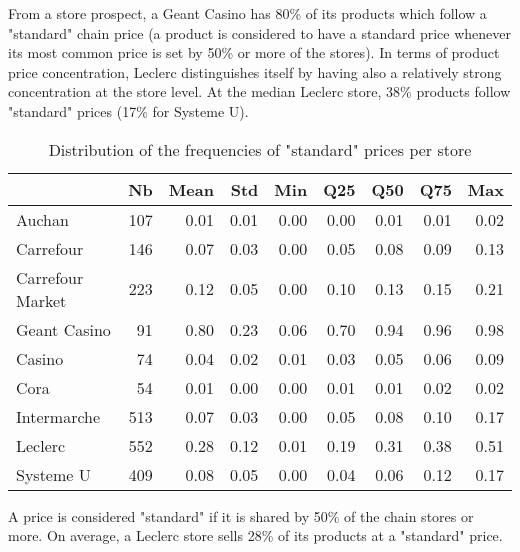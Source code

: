 \documentclass[english]{article}
\begin{document}
From a store prospect, a Geant Casino has 80\% of its products which follow a "standard" chain price (a product is considered to have a standard price whenever its most common price is set by 50\% or more of the stores). In terms of product price concentration, Leclerc distinguishes itself by having also a relatively strong concentration at the store level. At the median Leclerc store, 38\% products follow "standard" prices (17\% for Systeme U).

\begin{table}[H]
\caption{Distribution of the frequencies of "standard" prices per store}
\label{tab:qlmc_store_freq_50}
\begin{threeparttable}
\renewcommand{\arraystretch}{0.7}%
\small
\begin{tabular}{lrrrrrrrr}
\toprule
\toprule
{}                &  Nb &  Mean &  Std &  Min &  Q25 &  Q50 &  Q75 &  Max \\
\midrule
Auchan            & 107 &  0.01 & 0.01 & 0.00 & 0.00 & 0.01 & 0.01 & 0.02 \\
Carrefour         & 146 &  0.07 & 0.03 & 0.00 & 0.05 & 0.08 & 0.09 & 0.13 \\
Carrefour Market  & 223 &  0.12 & 0.05 & 0.00 & 0.10 & 0.13 & 0.15 & 0.21 \\
Geant Casino      &  91 &  0.80 & 0.23 & 0.06 & 0.70 & 0.94 & 0.96 & 0.98 \\
Casino            &  74 &  0.04 & 0.02 & 0.01 & 0.03 & 0.05 & 0.06 & 0.09 \\
Cora              &  54 &  0.01 & 0.00 & 0.00 & 0.01 & 0.01 & 0.02 & 0.02 \\
Intermarche       & 513 &  0.07 & 0.03 & 0.00 & 0.05 & 0.08 & 0.10 & 0.17 \\
Leclerc           & 552 &  0.28 & 0.12 & 0.01 & 0.19 & 0.31 & 0.38 & 0.51 \\
Systeme U         & 409 &  0.08 & 0.05 & 0.00 & 0.04 & 0.06 & 0.12 & 0.17 \\
\bottomrule
\bottomrule
\end{tabular}
\begin{tablenotes}
      \small
      \item A price is considered "standard" if it is shared by 50\% of the chain stores or more. On average, a Leclerc store sells 28\% of its products at a "standard" price.
\end{tablenotes}
\end{threeparttable}
\end{table}
\end{document}
